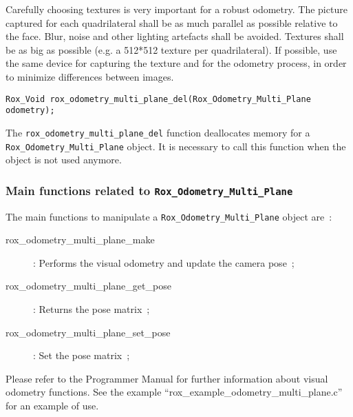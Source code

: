 Carefully choosing textures is very important for a robust odometry. The picture captured for each quadrilateral shall be as much 
parallel as possible relative to the face. Blur, noise and other lighting artefacts shall be avoided. Textures shall be as big as 
possible (e.g. a 512{*}512 texture per quadrilateral). If possible, use the same device for capturing the texture and for the 
odometry process, in order to minimize differences between images.

\begin{lstlisting}
Rox_Void rox_odometry_multi_plane_del(Rox_Odometry_Multi_Plane odometry);
\end{lstlisting}
The \lstinline$rox_odometry_multi_plane_del$ function deallocates memory for a \lstinline$Rox_Odometry_Multi_Plane$ object. It is necessary to call this function when the object is not used anymore. \\

\subsubsection{Main functions related to {\tt Rox\_Odometry\_Multi\_Plane}}
\label{sss:odometry_multi_plane_methods}

The main functions to manipulate a \lstinline$Rox_Odometry_Multi_Plane$ object are~:
\begin{description}
  \item[rox\_odometry\_multi\_plane\_make]: Performs the visual odometry and update the camera pose~;
  \item[rox\_odometry\_multi\_plane\_get\_pose]: Returns the pose matrix~;
  \item[rox\_odometry\_multi\_plane\_set\_pose]: Set the pose matrix~;
\end{description}

Please refer to the Programmer Manual for further information about visual odometry functions.
See the example ``rox\_example\_odometry\_multi\_plane.c'' for an example of use.

